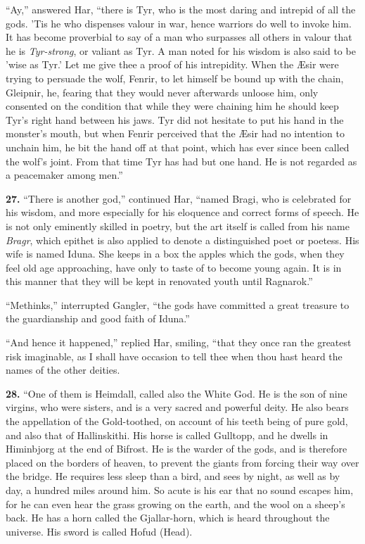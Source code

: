 ``Ay,'' answered Har, ``there is Tyr, who is the most daring and intrepid
of all the gods. 'Tis he who dispenses valour in war, hence warriors
do well to invoke him. It has become proverbial to say of a man who
surpasses all others in valour that he is \emph{Tyr-strong}, or valiant as
Tyr. A man noted for his wisdom is also said to be 'wise as Tyr.' Let
me give thee a proof of his intrepidity. When the Æsir were trying to
persuade the wolf, Fenrir, to let himself be bound up with the chain,
Gleipnir, he, fearing that they would never afterwards unloose him,
only consented on the condition that while they were chaining him he
should keep Tyr's right hand between his jaws. Tyr did not hesitate to
put his hand in the monster's mouth, but when Fenrir perceived that
the Æsir had no intention to unchain him, he bit the hand off at that
point, which has ever since been called the wolf's joint. From that
time Tyr has had but one hand. He is not regarded as a peacemaker
among men.''


\textbf{27.} ``There is another god,'' continued Har, ``named Bragi, who is
celebrated for his wisdom, and more especially for his eloquence and
correct forms of speech. He is not only eminently skilled in poetry,
but the art itself is called from his name \emph{Bragr}, which epithet is
also applied to denote a distinguished poet or poetess. His wife is
named Iduna. She keeps in a box the apples which the gods, when they
feel old age approaching, have only to taste of to become young again.
It is in this manner that they will be kept in renovated youth until
Ragnarok.''

``Methinks,'' interrupted Gangler, ``the gods have committed a great
treasure to the guardianship and good faith of Iduna.''

``And hence it happened,'' replied Har, smiling, ``that they once ran the
greatest risk imaginable, as I shall have occasion to tell thee when
thou hast heard the names of the other deities.

\textbf{28.} ``One of them is Heimdall, called also the White God. He is the
son of nine virgins, who were sisters, and is a very sacred and
powerful deity. He also bears the appellation of the Gold-toothed, on
account of his teeth being of pure gold, and also that of
Hallinskithi. His horse is called Gulltopp, and he dwells in
Himinbjorg at the end of Bifrost. He is the warder of the gods, and is
therefore placed on the borders of heaven, to prevent the giants from
forcing their way over the bridge. He requires less sleep than a bird,
and sees by night, as well as by day, a hundred miles around him. So
acute is his ear that no sound escapes him, for he can even hear the
grass growing on the earth, and the wool on a sheep's back. He has a
horn called the Gjallar-horn, which is heard throughout the universe.
His sword is called Hofud (Head).

